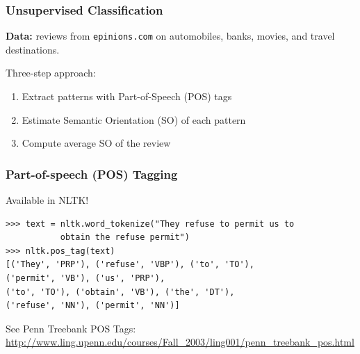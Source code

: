 \documentclass[t]{beamer}
\begin{document}
\begin{frame} \frametitle{Unsupervised Classification} %



\vfill

\textbf{Data:} reviews from {\tt epinions.com} on automobiles, banks, movies, and
travel destinations. 

\vfill

Three-step approach:
\begin{enumerate}
\item Extract patterns with Part-of-Speech (POS) tags

\item Estimate Semantic Orientation (SO) of each pattern

\item Compute average SO of the review

\end{enumerate}

\end{frame} 


\begin{frame}[fragile]

 \frametitle{Part-of-speech (POS) Tagging}

 
\begin{block}{Available in NLTK!}
{\small
\begin{verbatim} 	
>>> text = nltk.word_tokenize("They refuse to permit us to
           obtain the refuse permit")
>>> nltk.pos_tag(text)
[('They', 'PRP'), ('refuse', 'VBP'), ('to', 'TO'), 
('permit', 'VB'), ('us', 'PRP'),
('to', 'TO'), ('obtain', 'VB'), ('the', 'DT'), 
('refuse', 'NN'), ('permit', 'NN')]
\end{verbatim}
}
\end{block}

See Penn Treebank POS Tags: \url{http://www.ling.upenn.edu/courses/Fall_2003/ling001/penn_treebank_pos.html}


\end{frame} 
\end{document}
